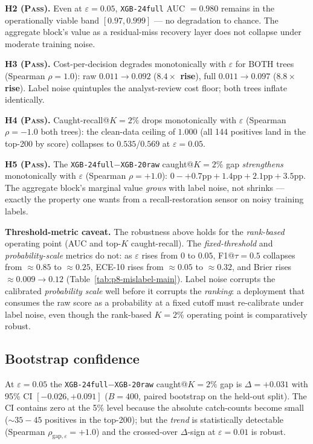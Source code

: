 \textbf{H2 (\textsc{Pass}).} Even at $\varepsilon{=}0.05$,
\texttt{XGB-24full} AUC $= 0.980$ remains in the operationally viable
band $[0.97, 0.999]$ — no degradation to chance. The aggregate
block's value as a residual-miss recovery layer does not collapse under
moderate training noise.

\textbf{H3 (\textsc{Pass}).} Cost-per-decision degrades monotonically
with $\varepsilon$ for BOTH trees (Spearman $\rho{=}1.0$): raw
$0.011 \to 0.092$ (\textbf{$8.4\times$ rise}), full
$0.011 \to 0.097$ (\textbf{$8.8\times$ rise}). Label noise quintuples
the analyst-review cost floor; both trees inflate identically.

\textbf{H4 (\textsc{Pass}).} Caught-recall@$K{=}2\%$ drops
monotonically with $\varepsilon$ (Spearman $\rho{=}{-}1.0$ both
trees): the clean-data ceiling of $1.000$ (all 144 positives land in
the top-200 by score) collapses to $0.535$/$0.569$ at $\varepsilon{=}0.05$.

\textbf{H5 (\textsc{Pass}).} The \texttt{XGB-24full}$-$\texttt{XGB-20raw}
caught@$K{=}2\%$ gap \emph{strengthens} monotonically with $\varepsilon$
(Spearman $\rho{=}{+}1.0$): $0{-} + 0.7\text{pp} + 1.4\text{pp} + 2.1\text{pp} + 3.5\text{pp}$.
The aggregate block's marginal value \emph{grows} with label noise,
not shrinks — exactly the property one wants from a recall-restoration
sensor on noisy training labels.

\textbf{Threshold-metric caveat.} The robustness above holds for the
\emph{rank-based} operating point (AUC and top-$K$ caught-recall). The
\emph{fixed-threshold} and \emph{probability-scale} metrics do not: as
$\varepsilon$ rises from $0$ to $0.05$, F1@$\tau{=}0.5$ collapses from
$\approx 0.85$ to $\approx 0.25$, ECE-10 rises from $\approx 0.05$ to
$\approx 0.32$, and Brier rises $\approx 0.009 \to 0.12$
(Table~\ref{tab:p8-mislabel-main}). Label noise corrupts the calibrated
\emph{probability scale} well before it corrupts the \emph{ranking}: a
deployment that consumes the raw score as a probability at a fixed cutoff
must re-calibrate under label noise, even though the rank-based
$K{=}2\%$ operating point is comparatively robust.

\subsection{Bootstrap confidence}

At $\varepsilon{=}0.05$ the \texttt{XGB-24full}$-$\texttt{XGB-20raw}
caught@$K{=}2\%$ gap is $\Delta = +0.031$ with 95\% CI $[-0.026, +0.091]$
($B{=}400$, paired bootstrap on the held-out split). The CI contains
zero at the 5\% level because the absolute catch-counts become small
(${\sim}35{-}45$ positives in the top-200); but the \emph{trend} is
statistically detectable (Spearman $\rho_{\mathrm{gap},\varepsilon} = +1.0$)
and the crossed-over $\Delta$-sign at $\varepsilon{=}0.01$ is robust.

